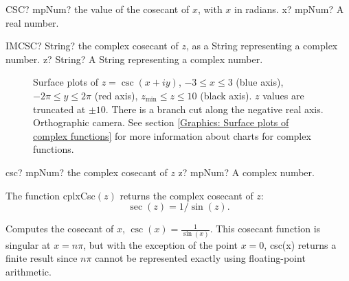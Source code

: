 \begin{mpFunctionsExtract}
	\mpWorksheetFunctionOneNotImplemented
	{CSC? mpNum? the value of the cosecant of $x$, with $x$ in radians.}
	{x? mpNum? A real number.}
\end{mpFunctionsExtract}

\vspace{0.6cm}
\begin{mpFunctionsExtract}
	\mpWorksheetFunctionOneNotImplemented
	{IMCSC? String? the complex cosecant of $z$, as a String representing a complex number.}
	{z? String? A String representing a complex number.}
\end{mpFunctionsExtract}


\begin{figure}[ht]%
	\centering
	\qquad
	\caption[Complex Cosecant]{Surface plots of $z = \csc(x + iy)$, $-3 \leq x \leq 3$ (blue axis), $-2 \pi \leq y \leq 2\pi$ (red axis), $z_{\text{min}} \leq z \leq 10$ (black axis). $z$ values are truncated at $\pm 10$. There is a branch cut along the negative real axis. Orthographic camera. See section \ref{Graphics: Surface plots of complex functions} for more information about charts for complex functions.} 
	\label{fig:Complex Cosecant}%
\end{figure}

\begin{mpFunctionsExtract}
	\mpFunctionOne
	{csc? mpNum? the complex cosecant of $z$}
	{z? mpNum? A complex number.}
\end{mpFunctionsExtract}

\vspace{0.3cm}
The function \textsf{cplxCsc$(z)$} returns the complex cosecant of $z$: 
\begin{equation}
	\sec(z) = 1/\sin(z).
\end{equation}


Computes the cosecant of $x$, $\csc(x)=\frac{1}{\sin(x)}$. This cosecant function is singular at $x=n \pi$, but with the exception of the point $x=0$, csc(x) returns a finite result since $n \pi$ cannot be represented exactly using floating-point arithmetic.


